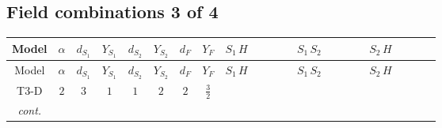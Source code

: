 \documentclass[8pt]{article}
\begin{document}
\begin{landscape}
\subsection*{Field combinations 3 of 4}
\begin{longtable}{@{}cccccccc >{\raggedright\arraybackslash}p{0.21\linewidth} >{\raggedright\arraybackslash}p{0.21\linewidth} >{\raggedright\arraybackslash}p{0.21\linewidth}@{}}
\toprule
Model & $\alpha$ & $d_{S_1}$ & $Y_{S_1}$ & $d_{S_2}$ & $Y_{S_2}$ & $d_F$ & $Y_F$ & $S_1\,H$ & $S_1\,S_2$ & $S_2\,H$ \\
\midrule
\endfirsthead
\toprule
Model & $\alpha$ & $d_{S_1}$ & $Y_{S_1}$ & $d_{S_2}$ & $Y_{S_2}$ & $d_F$ & $Y_F$ & $S_1\,H$ & $S_1\,S_2$ & $S_2\,H$ \\
\midrule
\endhead
T3-D & $2$ & $3$ & $1$ & $1$ & $2$ & $2$ & $\frac{3}{2}$ & \scriptsize\adjustbox{max width=\linewidth}{$\begin{gathered} +\frac{1}{2} H_{a_2} S_{1,j_2} H_{a_1}{}^{\dagger } S_{1,j_1}{}^{\dagger } \mathcal{I}_{H1,a_1,a_2,j_1,j_2}{}^1 \lambda_{HS_1}^{(1)}^{(1)} \\ +\frac{1}{2} H_{a_2} S_{1,j_2} H_{a_1}{}^{\dagger } S_{1,j_1}{}^{\dagger } \mathcal{I}_{H1,a_1,a_2,j_2,j_1}{}^1 \lambda_{HS_1}^{(1)}^{(1)} \\ +\frac{1}{2} H_{a_2} S_{1,j_2} H_{a_1}{}^{\dagger } S_{1,j_1}{}^{\dagger } \mathcal{I}_{H1,a_1,a_2,j_1,j_2}{}^2 \lambda_{HS_1}^{(1)}^{(2)}\end{gathered}$} & \scriptsize\adjustbox{max width=\linewidth}{$\begin{gathered} +S_2 S_{1,j_2} S_2{}^{\dagger } S_{1,j_1}{}^{\dagger } \mathcal{I}_{12,j_1,j_2}{}^1 \lambda_{12}^{(1)}^{(1)}\end{gathered}$} & \scriptsize\adjustbox{max width=\linewidth}{$\begin{gathered} +H_{a_2} S_2 H_{a_1}{}^{\dagger } S_2{}^{\dagger } \mathcal{I}_{H2,a_1,a_2}{}^1 \lambda_{HS_2}^{(1)}^{(1)}\end{gathered}$} \\
\textit{cont.} &  &  &  &  &  &  &  & \scriptsize\adjustbox{max width=\linewidth}{$\begin{gathered} +\frac{1}{2} H_{a_2} S_{1,j_2} H_{a_1}{}^{\dagger } S_{1,j_1}{}^{\dagger } \mathcal{I}_{H1,a_1,a_2,j_2,j_1}{}^2 \lambda_{HS_1}^{(1)}^{(2)}\end{gathered}$} &  &  \\
\midrule
\bottomrule
\end{longtable}
\clearpage

\end{landscape}
\end{document}
